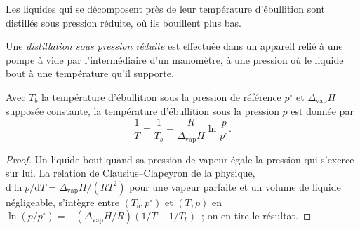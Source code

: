 Les liquides qui se décomposent près de leur température d'ébullition sont distillés sous pression
réduite, où ils bouillent plus bas.

\begin{definition}\label{def:b2:lab-techniques-2:reduced-pressure}
Une \emph{distillation sous pression réduite} est effectuée
dans un appareil relié à une pompe à vide par l'intermédiaire d'un manomètre, à une pression où le
liquide bout à une température qu'il supporte.
\end{definition}

\begin{proposition}\label{prop:b2:lab-techniques-2:reduced-pressure}
Avec $T_b$ la température d'ébullition sous la pression de référence $p^\circ$ et $\Delta_{\mathrm{vap}}H$
supposée constante, la température d'ébullition sous la pression $p$ est donnée par
\begin{equation*}
\frac{1}{T} = \frac{1}{T_b} - \frac{R}{\Delta_{\mathrm{vap}}H}\ln\frac{p}{p^\circ}.
\end{equation*}
\end{proposition}

\begin{proof}
Un liquide bout quand sa pression de vapeur égale la pression qui s'exerce sur lui. La relation de
Clausius--Clapeyron de la physique, $\mathrm d\ln p/\mathrm dT = \Delta_{\mathrm{vap}}H/(RT^2)$ pour une
vapeur parfaite et un volume de liquide négligeable, s'intègre entre $(T_b, p^\circ)$ et $(T, p)$ en $\ln(p/p^\circ) =
-(\Delta_{\mathrm{vap}}H/R)(1/T - 1/T_b)$~; on en tire le résultat.
\end{proof}

